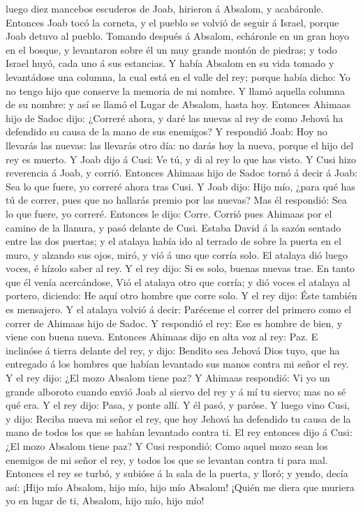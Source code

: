 luego diez mancebos escuderos de Joab, hirieron á Absalom, y acabáronle.
 Entonces Joab tocó la corneta, y el pueblo se volvió de
seguir á Israel, porque Joab detuvo al pueblo.  Tomando
después á Absalom, echáronle en un gran hoyo en el bosque, y levantaron
sobre él un muy grande montón de piedras; y todo Israel huyó, cada uno á
sus estancias.  Y había Absalom en su vida tomado y
levantádose una columna, la cual está en el valle del rey; porque había
dicho: Yo no tengo hijo que conserve la memoria de mi nombre. Y llamó
aquella columna de su nombre: y así se llamó el Lugar de Absalom, hasta
hoy.  Entonces Ahimaas hijo de Sadoc dijo: ¿Correré
ahora, y daré las nuevas al rey de como Jehová ha defendido su causa de
la mano de sus enemigos?  Y respondió Joab: Hoy no
llevarás las nuevas: las llevarás otro día: no darás hoy la nueva,
porque el hijo del rey es muerto.  Y Joab dijo á Cusi: Ve
tú, y di al rey lo que has visto. Y Cusi hizo reverencia á Joab, y
corrió.  Entonces Ahimaas hijo de Sadoc tornó á decir á
Joab: Sea lo que fuere, yo correré ahora tras Cusi. Y Joab dijo: Hijo
mío, ¿para qué has tú de correr, pues que no hallarás premio por las
nuevas?  Mas él respondió: Sea lo que fuere, yo correré.
Entonces le dijo: Corre. Corrió pues Ahimaas por el camino de la
llanura, y pasó delante de Cusi.  Estaba David á la sazón
sentado entre las dos puertas; y el atalaya había ido al terrado de
sobre la puerta en el muro, y alzando sus ojos, miró, y vió á uno que
corría solo.  El atalaya dió luego voces, é hízolo saber
al rey. Y el rey dijo: Si es solo, buenas nuevas trae. En tanto que él
venía acercándose,  Vió el atalaya otro que corría; y dió
voces el atalaya al portero, diciendo: He aquí otro hombre que corre
solo. Y el rey dijo: Éste también es mensajero.  Y el
atalaya volvió á decir: Paréceme el correr del primero como el correr de
Ahimaas hijo de Sadoc. Y respondió el rey: Ese es hombre de bien, y
viene con buena nueva.  Entonces Ahimaas dijo en alta voz
al rey: Paz. E inclinóse á tierra delante del rey, y dijo: Bendito sea
Jehová Dios tuyo, que ha entregado á los hombres que habían levantado
sus manos contra mi señor el rey.  Y el rey dijo: ¿El
mozo Absalom tiene paz? Y Ahimaas respondió: Vi yo un grande alboroto
cuando envió Joab al siervo del rey y á mí tu siervo; mas no sé qué era.
 Y el rey dijo: Pasa, y ponte allí. Y él pasó, y paróse.
 Y luego vino Cusi, y dijo: Reciba nueva mi señor el rey,
que hoy Jehová ha defendido tu causa de la mano de todos los que se
habían levantado contra ti.  El rey entonces dijo á Cusi:
¿El mozo Absalom tiene paz? Y Cusi respondió: Como aquel mozo sean los
enemigos de mi señor el rey, y todos los que se levantan contra ti para
mal.  Entonces el rey se turbó, y subióse á la sala de la
puerta, y lloró; y yendo, decía así: ¡Hijo mío Absalom, hijo mío, hijo
mío Absalom! ¡Quién me diera que muriera yo en lugar de ti, Absalom,
hijo mío, hijo mío!

